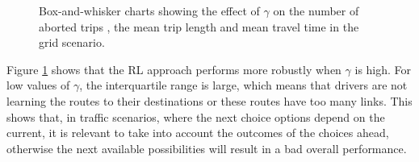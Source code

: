 \documentclass{RITA}
\begin{document}
\begin{figure}[ht]
  \centering
  \caption{Box-and-whisker charts showing the effect of $\gamma$ on the number of aborted trips , the mean trip length  and mean travel time  in the grid scenario.}
  \label{fig:qLearningGamma-grid}
\end{figure}

Figure \ref{fig:qLearningGamma-grid} shows that the RL approach performs more robustly when $\gamma$ is high. For low values of $\gamma$, the interquartile range is large, which means that drivers are not learning the routes to their destinations or these routes have too many links. This shows that, in traffic scenarios, where the next choice options depend on the current, it is relevant to take into account the outcomes of the choices ahead, otherwise the next available possibilities will result in a bad overall performance.
\end{document}
